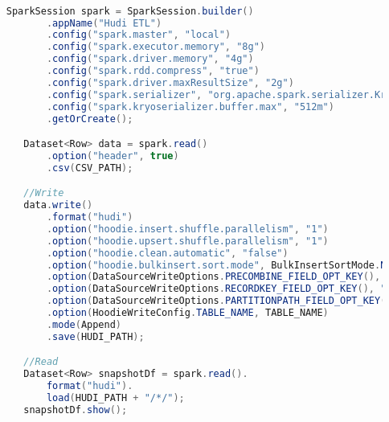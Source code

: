 \documentclass[%
bachelor,    %
subf,        %
href,        %
colorlinks,  %
]{disser}
\begin{document}
\begin{lstlisting}[caption={Запись из CSV в Hudi таблицу},captionpos=b,label={lst:1},language=Java]

     SparkSession spark = SparkSession.builder()
            .appName("Hudi ETL")
            .config("spark.master", "local")
            .config("spark.executor.memory", "8g")
            .config("spark.driver.memory", "4g")
            .config("spark.rdd.compress", "true")
            .config("spark.driver.maxResultSize", "2g")
            .config("spark.serializer", "org.apache.spark.serializer.KryoSerializer")
            .config("spark.kryoserializer.buffer.max", "512m")
            .getOrCreate();

        Dataset<Row> data = spark.read()
            .option("header", true)
            .csv(CSV_PATH);

        //Write
        data.write()
            .format("hudi")
            .option("hoodie.insert.shuffle.parallelism", "1")
            .option("hoodie.upsert.shuffle.parallelism", "1")
            .option("hoodie.clean.automatic", "false")
            .option("hoodie.bulkinsert.sort.mode", BulkInsertSortMode.NONE.toString())
            .option(DataSourceWriteOptions.PRECOMBINE_FIELD_OPT_KEY(), "timestamp")
            .option(DataSourceWriteOptions.RECORDKEY_FIELD_OPT_KEY(), "uuid")
            .option(DataSourceWriteOptions.PARTITIONPATH_FIELD_OPT_KEY(), "")
            .option(HoodieWriteConfig.TABLE_NAME, TABLE_NAME)
            .mode(Append)
            .save(HUDI_PATH);

        //Read
        Dataset<Row> snapshotDf = spark.read().
            format("hudi").
            load(HUDI_PATH + "/*/");
        snapshotDf.show();
\end{lstlisting}
\newpage
\end{document}
